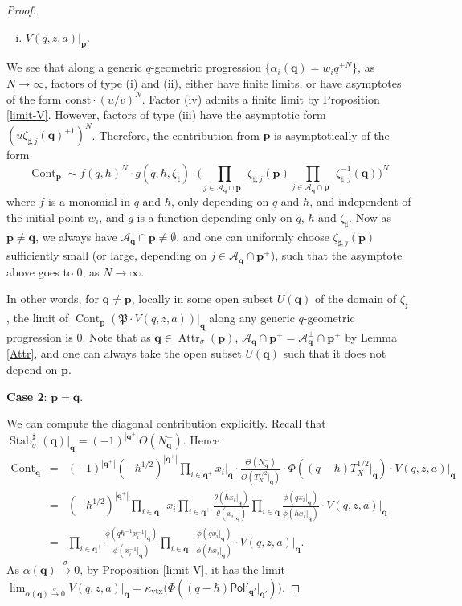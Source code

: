 \documentclass[10pt]{amsart}
\theoremstyle{definition}
\def\ben{\begin{eqnarray*}}
\def\een{\end{eqnarray*}}
\newcommand{\bp}{\mathbf{p}}
\newcommand{\bq}{\mathbf{q}}
\newcommand{\cA}{\mathcal{A}}
\newcommand{\Attr}{\operatorname{Attr}}
\newcommand{\Cont}{\operatorname{Cont}}
\newcommand{\Stab}{\operatorname{Stab}}
\newcommand{\fP}{\mathfrak{P}}
\newcommand{\Pol}{\mathsf{Pol}}
\theoremstyle{definition}
\numberwithin{equation}{section}
\theoremstyle{Theorem}
\begin{document}
\begin{proof}
\begin{enumerate}[(i)]
\item $V(q, z, a) |_\bp$.

\end{enumerate}

We see that along a generic $q$-geometric progression $\{\alpha_i (\bq) = w_i q^{\pm N} \}$, as $N\to \infty$, factors of type (i) and (ii), either have finite limits, or have asymptotes of the form $\text{const}\cdot (u/v)^N$. Factor (iv) admits a finite limit by Proposition \ref{limit-V}. However, factors of type (iii) have the asymptotic form
$( u \zeta_{\sharp, j} (\bq)^{\mp 1} )^N$. Therefore, the contribution from $\bp$ is asymptotically of the form
$$
\Cont_\bp \sim  f(q, \hbar)^N \cdot g(q, \hbar, \zeta_\sharp) \cdot \Big( \prod_{j\in \cA_\bq \cap \bp^+ } \zeta_{\sharp, j} (\bp) \prod_{j \in \cA_\bq \cap \bp^-} \zeta^{-1}_{\sharp, j} (\bq) \Big)^N
$$
where $f$ is a monomial in $q$ and $\hbar$, only depending on $q$ and $\hbar$, and independent of the initial point $w_i$, and $g$ is a function depending only on $q$, $\hbar$ and $\zeta_\sharp$. Now as $\bp\neq \bq$, we always have $\cA_\bq \cap \bp\neq \emptyset$, and one can uniformly choose $\zeta_{\sharp, j} (\bp)$ sufficiently small (or large, depending on $j\in \cA_\bq \cap \bp^\pm$), such that the asymptote above goes to $0$, as $N\to \infty$.

In other words, for $\bq \neq \bp$, locally in some open subset $U(\bq)$ of the domain of $\zeta_\sharp$, the limit of $\Cont_\bp (\fP \cdot V(q,z,a) ) \big|_\bq$ along any generic $q$-geometric progression is $0$. Note that as $\bq\in \overline{\Attr_\sigma (\bp)}$,  $\cA_\bq \cap \bp^\pm = \cA_\bq^\pm \cap \bp^\pm$ by Lemma \ref{Attr}, and one can always take the open subset $U(\bq)$ such that it does not depend on $\bp$.

\textbf{Case 2}: $\bp = \bq$.

We can compute the diagonal contribution explicitly. Recall that $\Stab^\sharp_\sigma (\bq) |_\bq = (-1)^{|\bq^+|} \Theta (N_\bq^-)$. Hence
\ben
\Cont_\bq &=& (-1)^{|\bq^+|} (-\hbar^{1/2})^{|\bq^+|}  \prod_{i\in \bq^+} x_i |_\bq \cdot \frac{ \Theta (N_\bq^-) }{\Theta (T_X^{1/2} |_\bq ) } \cdot \Phi ((q-\hbar) T^{1/2}_X |_\bq )  \cdot V(q,z,a) \big|_\bq \\
&=& (-\hbar^{1/2})^{|\bq^+|}  \prod_{i\in \bq^+} x_i  \prod_{i\in \bq^+} \frac{\theta (\hbar x_i |_\bq)}{\theta (x_i |_\bq)} \prod_{i\in \bq} \frac{\phi (q x_i |_\bq)}{\phi (\hbar x_i |_\bq)} \cdot V(q, z, a) |_\bq \\
&=& \prod_{i\in \bq^+} \frac{\phi (q \hbar^{-1} x_i^{-1} |_\bq) }{\phi (x_i^{-1} |_\bq)} \prod_{i\in \bq^-} \frac{\phi (q x_i |_\bq)}{\phi (\hbar x_i |_\bq)} \cdot V(q, z, a) |_\bq.
\een
As $\alpha(\bq) \xrightarrow{\sigma} 0$, by Proposition \ref{limit-V}, it has the limit $\lim_{\alpha(\bq) \xrightarrow{\sigma} 0} V(q,z,a) |_\bq = \kappa_{\mathrm{vtx}} \Big( \Phi ((q-\hbar) \Pol'_{\bq'} |_{\bq'} ) \Big)$.


\end{proof}
\end{document}
